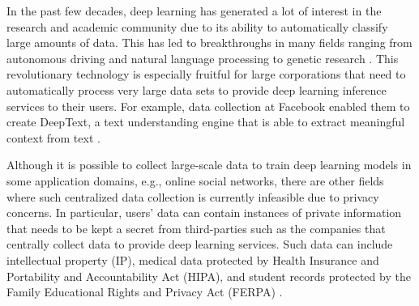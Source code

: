 \documentclass[letterpaper]{article}
\begin{document}
\begin{flushleft}
{In the past few decades, deep learning has generated a lot of interest in the research and academic community due to its ability
to automatically classify large amounts of data. This has led to breakthroughs in many fields ranging
from autonomous driving and natural language processing to genetic research 
\cite{young2018recent, al2017deep, huval2015empirical, danaee2017deep}.
This revolutionary technology is especially fruitful for large corporations that need to automatically process very large data sets to
provide deep learning inference services to their users. For example, data collection at Facebook enabled them to create DeepText, a
text understanding engine that is able to extract meaningful context from text \cite{abdulkader2016introducing}.

Although it is possible to collect large-scale data to train deep learning models in some application domains, e.g., online social
networks, there are other fields where such centralized data collection is currently infeasible due to privacy
concerns. In particular, users' data can contain instances of private information that needs to be kept a secret from third-parties
such as the companies that centrally collect data to provide deep learning services. Such data
can include
intellectual property (IP), 
medical data protected by Health Insurance and Portability and Accountability Act (HIPA), and student records protected by the Family
Educational Rights and Privacy Act (FERPA) \cite{act1996health,blechner2002health,shultz2015your}. 

}
\end{flushleft}
\end{document}
